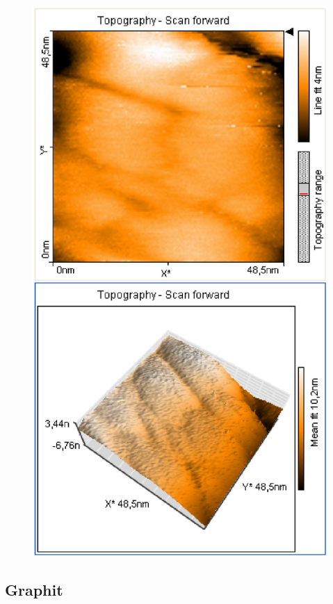 \documentclass[12pt]{article}
\begin{document}
\begin{figure}[H]
\begin{minipage}{0.4\linewidth}
\includegraphics[width=0.9\linewidth]{../plot/data/goldgitter/goldgitter8.eps}
\end{minipage}
\end{figure}

\subsection{Graphit}
\end{document}
